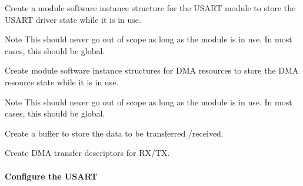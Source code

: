 \begin{DoxyEnumerate}
\item Create a module software instance structure for the U\+S\+A\+R\+T module to store the U\+S\+A\+R\+T driver state while it is in use. 
\begin{DoxyCodeInclude}
\end{DoxyCodeInclude}
 \begin{DoxyNote}{Note}
This should never go out of scope as long as the module is in use. In most cases, this should be global.
\end{DoxyNote}

\item Create module software instance structures for D\+M\+A resources to store the D\+M\+A resource state while it is in use. 
\begin{DoxyCodeInclude}
\end{DoxyCodeInclude}
 \begin{DoxyNote}{Note}
This should never go out of scope as long as the module is in use. In most cases, this should be global.
\end{DoxyNote}

\item Create a buffer to store the data to be transferred /received. 
\begin{DoxyCodeInclude}
\end{DoxyCodeInclude}

\item Create D\+M\+A transfer descriptors for R\+X/\+T\+X. 
\begin{DoxyCodeInclude}
\end{DoxyCodeInclude}
 
\end{DoxyEnumerate}\hypertarget{asfdoc_sam0_sercom_usart_dma_use_case_asfdoc_sam0_usart_dma_use_case_setup_flow_usart}{}\paragraph{Configure the U\+S\+A\+R\+T}\label{asfdoc_sam0_sercom_usart_dma_use_case_asfdoc_sam0_usart_dma_use_case_setup_flow_usart}

